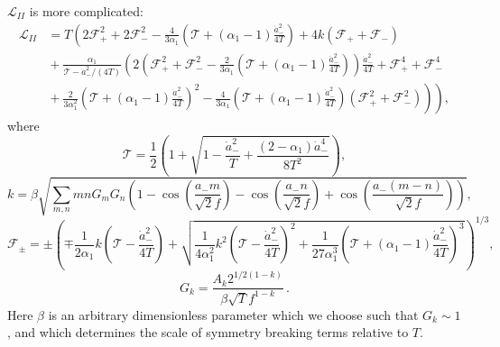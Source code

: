 \documentclass[a4paper,11pt]{article}
\begin{document}
  $\mathcal{L}_{II}$ is more complicated:
\begin{equation}
  \begin{split} \label{eq.axionLagrangian.II}
    \mathcal{L}_{II} &= T \left(2\mathcal{F}_{+}^2+2\mathcal{F}_{-}^2-\frac{4}{3\alpha_1}\left(\mathcal{T}+\left(\alpha_1-1\right)\frac{{\dot{a}}_{-}^2}{4 T}\right) + 4k \left(\mathcal{F}_{+}+\mathcal{F}_{-}\right) \right. \\
    & \left.{}+\frac{\alpha_1}{\mathcal{T}-{\dot{a}}_{-}^2/\left(4T\right)}\left(2\left(\mathcal{F}_{+}^2+\mathcal{F}_{-}^2-\frac{2}{3\alpha_1}\left(\mathcal{T}+\left(\alpha_1-1\right)\frac{{\dot{a}}_{-}^2}{4 T}\right)\right)\frac{{\dot{a}}_{-}^2}{4 T} +\mathcal{F}_{+}^4+\mathcal{F}_{-}^4 \right.\right. \\
    & \left.\left.{}+\frac{2}{3\alpha_1^2}{\left(\mathcal{T}+\left(\alpha_1-1\right)\frac{{\dot{a}}_{-}^2}{4 T}\right)}^2-\frac{4}{3\alpha_1}\left(\mathcal{T}+\left(\alpha_1-1\right)\frac{{\dot{a}}_{-}^2}{4 T}\right)\left(\mathcal{F}_{+}^2+\mathcal{F}_{-}^2\right)\right)\right),
  \end{split}
  \end{equation}
  where
  \begin{equation}
    \mathcal{T}=\frac{1}{2} \left(1+\sqrt{1-\frac{{\dot{a}}_{-}^2}{T}+\frac{\left(2-\alpha_1\right){\dot{a}}_{-}^4}{8 T^2}}\right),
  \end{equation}
  \begin{equation}
    k=\beta \sqrt{\sum_{m, n}m n G_mG_n \left(1-\cos\left(\frac{a_- m}{\sqrt 2 f}\right)-\cos\left(\frac{a_- n}{\sqrt 2 f}\right)+\cos\left(\frac{a_- \left(m-n\right)}{\sqrt 2 f}\right)\right)},
  \end{equation}
  \begin{equation}
    \mathcal{F}_{\pm} = \pm \left(\mp\frac{1}{2\alpha_1}k \left(\mathcal{T}-\frac{{\dot{a}}_{-}^2}{4 T}\right) + \sqrt{ \frac{1}{4\alpha_1^2} k^2 \left(\mathcal{T}-\frac{{\dot{a}}_{-}^2}{4 T}\right)^2+\frac{1}{27\alpha_1^3}{\left(\mathcal{T}+\left(\alpha_1-1\right)\frac{{\dot{a}}_{-}^2}{4 T}\right)}^3}\right)^{1/3},
  \end{equation}
  \begin{equation}
    G_k = \frac{A_k 2^{1/2 (1 - k)}}{\beta \sqrt T f^{1-k}}\,.
  \end{equation}
  Here $\beta$ is an arbitrary dimensionless parameter which we choose such that $G_k \sim 1$, and which determines the scale of symmetry breaking terms relative to $T$.
  
\end{document}
